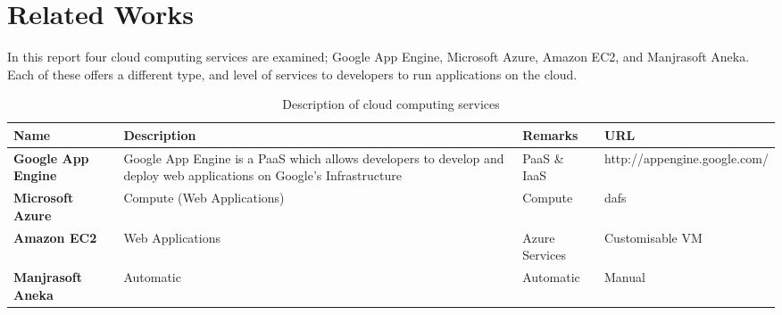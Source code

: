 \chapter{Related Works}
In this report four cloud computing services are examined; Google App Engine, Microsoft Azure, Amazon EC2, and Manjrasoft Aneka. Each of these offers a different type, and level of services to developers to run applications on the cloud.

\begin{table}[h]
\centering
\begin{tabular}{|p{2.5cm}||p{3cm} p{3cm} p{5cm}|}
\hline 
\textbf{Name} & \textbf{Description} & \textbf{Remarks} & \textbf{URL}\tabularnewline
\hline 
\hline 
\textbf{Google App Engine} & Google App Engine is a PaaS which allows developers to develop and deploy web applications on Google's Infrastructure & PaaS \& IaaS & \small{http://appengine.google.com/}\tabularnewline
\textbf{Microsoft Azure} & Compute (Web Applications) & Compute & dafs \tabularnewline
\textbf{Amazon EC2} & Web Applications & Azure Services & Customisable VM\tabularnewline
\textbf{Manjrasoft Aneka} & Automatic & Automatic & Manual\tabularnewline
\hline
\end{tabular}
\caption{Description of cloud computing services}
\end{table}
